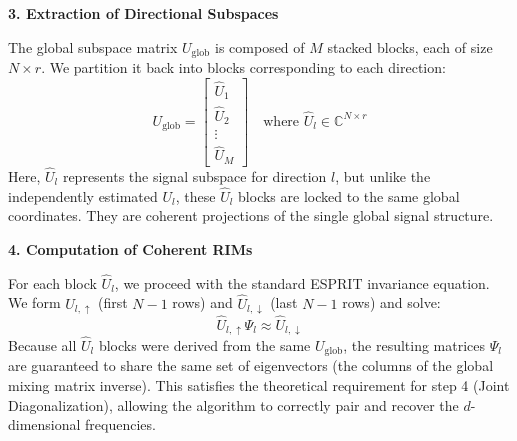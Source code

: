 \textbf{3. Extraction of Directional Subspaces}

The global subspace matrix $U_{\text{glob}}$ is composed of $M$ stacked blocks, each of size $N \times r$. We partition it back into blocks corresponding to each direction:
\[
U_{\text{glob}} = \begin{bmatrix} \hat{U}_1 \\ \hat{U}_2 \\ \vdots \\ \hat{U}_M \end{bmatrix} \quad \text{where } \hat{U}_l \in \mathbb{C}^{N \times r}
\]
Here, $\hat{U}_l$ represents the signal subspace for direction $l$, but unlike the independently estimated $U_l$, these $\hat{U}_l$ blocks are locked to the same global coordinates. They are coherent projections of the single global signal structure.

\textbf{4. Computation of Coherent RIMs}

For each block $\hat{U}_l$, we proceed with the standard ESPRIT invariance equation. We form $\hat{U}_{l, \uparrow}$ (first $N-1$ rows) and $\hat{U}_{l, \downarrow}$ (last $N-1$ rows) and solve:
\[
\hat{U}_{l, \uparrow} \Psi_l \approx \hat{U}_{l, \downarrow}
\]
Because all $\hat{U}_l$ blocks were derived from the same $U_{\text{glob}}$, the resulting matrices $\Psi_l$ are guaranteed to share the same set of eigenvectors (the columns of the global mixing matrix inverse). This satisfies the theoretical requirement for step 4 (Joint Diagonalization), allowing the algorithm to correctly pair and recover the $d$-dimensional frequencies.